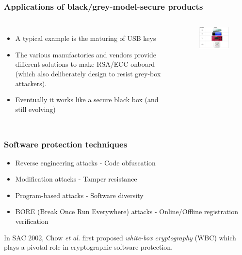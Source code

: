 \documentclass[aspectratio=169,xcolor=dvipsnames]{beamer}
\begin{document}

\frame
{
\frametitle{Applications of black/grey-model-secure products}
\begin{columns}[c]
\begin{itemize}
\item A typical example is the maturing of USB keys
\item The various manufactories and vendors provide different solutions to make RSA/ECC onboard (which also deliberately design to resist grey-box attackers).
\item Eventually it works like a secure black box (and still evolving)
\end{itemize}
\begin{figure}[htbp]
\centering
  \includegraphics[width=4.8cm]{./pics/usbkey.png}
\end{figure}

\end{columns}

}

\frame
{
\frametitle{Software protection techniques}
\begin{itemize}
\item \textcolor[rgb]{1.00, 0.00, 0.00}{Reverse engineering attacks} - \textcolor[rgb]{0.00,1.00,0.00}{Code obfuscation}

\item \textcolor[rgb]{1.00, 0.00, 0.00}{Modification attacks} - \textcolor[rgb]{0.00,1.00,0.00}{Tamper resistance}

\item \textcolor[rgb]{1.00, 0.00, 0.00}{Program-based attacks} - \textcolor[rgb]{0.00,1.00,0.00}{Software diversity}

\item \textcolor[rgb]{1.00, 0.00, 0.00}{BORE (Break Once Run Everywhere) attacks} - \textcolor[rgb]{0.00,1.00,0.00}{Online/Offline registration verification}
\end{itemize}

In SAC 2002, Chow \textit{et al.} first proposed \textit{white-box cryptography} (WBC) which plays a pivotal role in cryptographic software protection.
}
\end{document}
